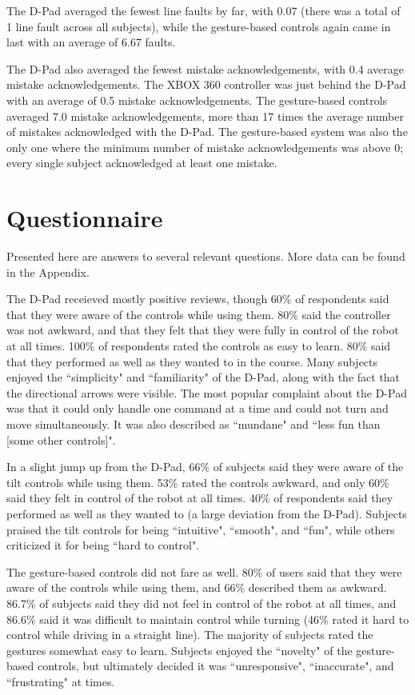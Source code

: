 \documentclass[12pt,a4paper]{report}
\begin{document}
The D-Pad averaged the fewest line faults by far, with 0.07 (there was a total of 1 line fault across all subjects), while the gesture-based controls again came in last with an average of 6.67 faults.

The D-Pad also averaged the fewest mistake acknowledgements, with 0.4 average mistake acknowledgements. The XBOX 360 controller was just behind the D-Pad with an average of 0.5 mistake acknowledgements. The gesture-based controls averaged 7.0 mistake acknowledgements, more than 17 times the average number of mistakes acknowledged with the D-Pad. The gesture-based system was also the only one where the minimum number of mistake acknowledgements was above 0; every single subject acknowledged at least one mistake.

\section{Questionnaire}
Presented here are answers to several relevant questions. More data can be found in the Appendix.

The D-Pad receieved mostly positive reviews, though 60\% of respondents said that they were aware of the controls while using them. 80\% said the controller was not awkward, and that they felt that they were fully in control of the robot at all times. 100\% of respondents rated the controls as easy to learn. 80\% said that they performed as well as they wanted to in the course. Many subjects enjoyed the ``simplicity" and ``familiarity" of the D-Pad, along with the fact that the directional arrows were visible. The most popular complaint about the D-Pad was that it could only handle one command at a time and could not turn and move simultaneously. It was also described as ``mundane" and ``less fun than [some other controls]".

In a slight jump up from the D-Pad, 66\% of subjects said they were aware of the tilt controls while using them. 53\% rated the controls awkward, and only 60\% said they felt in control of the robot at all times. 40\% of respondents said they performed as well as they wanted to (a large deviation from the D-Pad). Subjects praised the tilt controls for being ``intuitive", ``smooth", and ``fun", while others criticized it for being ``hard to control".

The gesture-based controls did not fare as well. 80\% of users said that they were aware of the controls while using them, and 66\% described them as awkward. 86.7\% of subjects said they did not feel in control of the robot at all times, and 86.6\% said it was difficult to maintain control while turning (46\% rated it hard to control while driving in a straight line). The majority of subjects rated the gestures somewhat easy to learn. Subjects enjoyed the ``novelty" of the gesture-based controls, but ultimately decided it was ``unresponsive", ``inaccurate", and ``frustrating" at times.
\end{document}
